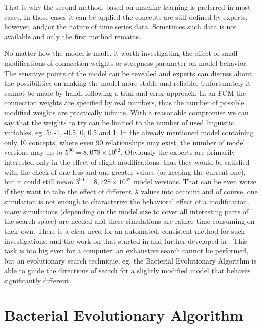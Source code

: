\documentclass[graybox]{svmult}
\begin{document}
That is why the second method, based on machine learning is preferred 
in most cases. In those cases it can be applied the concepts 
are still defined by experts, however, and/or the nature of time series data. 
Sometimes such data is not available and only the first method 
remains.

No matter how the model is made, it worth investigating the effect 
of small modifications of connection weights or steepness parameter 
on model behavior. The sensitive points of the model can be revealed 
and experts can discuss about the possibilities on making the model 
more stable and reliable. Unfortunately it cannot be made by hand, 
following a trial and error approach. In an FCM the connection 
weights are specified by real numbers, thus the number of possible 
modified weights are practically infinite. With a reasonable 
compromise we can say that the weights to try can be limited to the 
number of used linguistic variables, eg. 5: -1, -0.5, 0, 0.5 and 1. 
In the already mentioned model containing only 10 concepts, where 
even 90 relationships may exist, the number of model versions may up 
to $5^{90} = 8,078\times10^{62}$. Obviously the experts are primarily 
interested only in the effect of slight modifications, thus they 
would be satisfied with the check of one less and one greater values 
(or keeping the current one), but it could still mean $3^{90} = 
8,728\times10^{42}$ model versions. That can be even worse if they 
want to take the effect of different $\lambda$ values into account and 
of course, one simulation is not enough to characterize the behavioral 
effect of a modification, many simulations (depending on the model 
size to cover all interesting parts of the search space) are needed 
and these simulations are rather time consuming on their own. There is 
a clear need for an automated, consistent method for such 
investigations, and the work on that started in 
\cite{hatwagner2016uncertainty,hatwagner2017behavioral} and further 
developed in \cite{hatwagner2019banking,hatwagner2018improved}. This 
task is too big even for a computer: an exhaustive search cannot be 
performed, but an evolutionary search technique, eg. the Bacterial 
Evolutionary Algorithm is able to guide the directions of search for a 
slightly modified model that behaves significantly different.

\section{Bacterial Evolutionary Algorithm}
\label{sec:bea}
\end{document}
